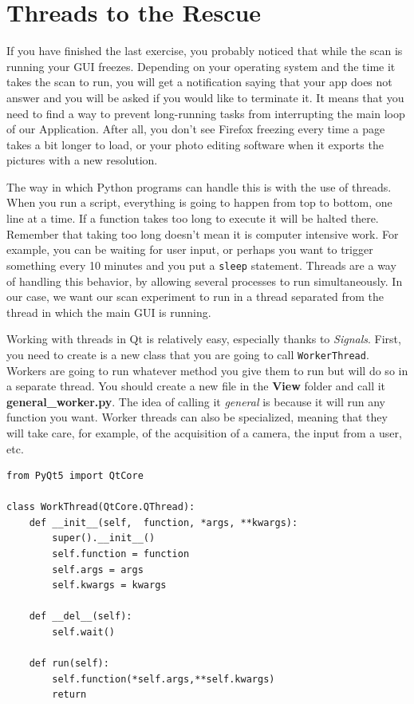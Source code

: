 \section{Threads to the Rescue}\label{threads-to-therescue}
If you have finished the last exercise, you probably noticed that while
the scan is running your {GUI} freezes. Depending on your operating
system and the time it takes the scan to run, you will get a
notification saying that your app does not answer and you will be asked
if you would like to terminate it. It means that you need to find a way
to prevent long-running tasks from interrupting the main loop of our
Application. After all, you don't see Firefox freezing every time a page
takes a bit longer to load, or your photo editing software when it
exports the pictures with a new resolution.

The way in which Python programs can handle this is with the use of
threads. When you run a script, everything is going to happen from top
to bottom, one line at a time. If a function takes too long to execute
it will be halted there. Remember that taking too long doesn't mean it
is computer intensive work. For example, you can be waiting for user
input, or perhaps you want to trigger something every 10 minutes and you
put a \texttt{sleep} statement. Threads are a way of handling this
behavior, by allowing several processes to run simultaneously. In our
case, we want our scan experiment to run in a thread separated from the
thread in which the main {GUI} is running.


Working with threads in Qt is relatively easy, especially thanks to
\emph{Signals}. First, you need to create is a new class that you are
going to call \texttt{WorkerThread}. Workers are going to run whatever
method you give them to run but will do so in a separate thread. You
should create a new file in the \textbf{View} folder and call it
\textbf{general\_worker.py}. The idea of calling it \emph{general} is
because it will run any function you want. Worker threads can also be
specialized, meaning that they will take care, for example, of the
acquisition of a camera, the input from a user, etc.

\begin{verbatim}
from PyQt5 import QtCore

class WorkThread(QtCore.QThread):
    def __init__(self,  function, *args, **kwargs):
        super().__init__()
        self.function = function
        self.args = args
        self.kwargs = kwargs

    def __del__(self):
        self.wait()

    def run(self):
        self.function(*self.args,**self.kwargs)
        return
\end{verbatim}

